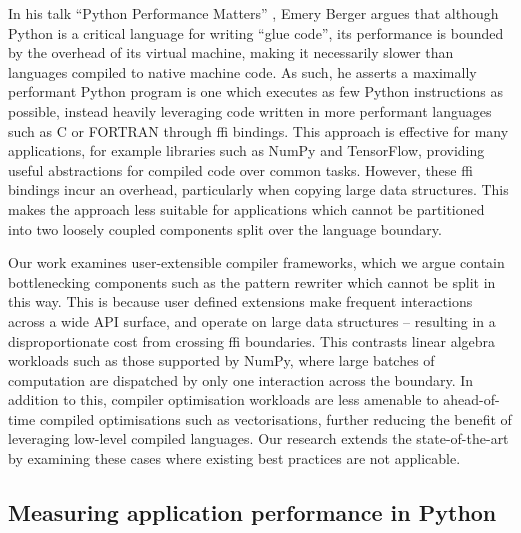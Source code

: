 In his talk ``Python Performance Matters'' \cite{emerybergerPythonPerformanceMatters2022}, Emery Berger argues that although Python is a critical language for writing ``glue code'', its performance is bounded by the overhead of its virtual machine, making it necessarily slower than languages compiled to native machine code.
As such, he asserts a maximally performant Python program is one which executes as few Python instructions as possible, instead heavily leveraging code written in more performant languages such as C or FORTRAN through \ac{ffi} bindings.
This approach is effective for many applications, for example libraries such as NumPy and TensorFlow, providing useful abstractions for compiled code over common tasks.
However, these \ac{ffi} bindings incur an overhead, particularly when copying large data structures.
This makes the approach less suitable for applications which cannot be partitioned into two loosely coupled components split over the language boundary.

Our work examines user-extensible compiler frameworks, which we argue contain bottlenecking components such as the pattern rewriter which cannot be split in this way.
This is because user defined extensions make frequent interactions across a wide API surface, and operate on large data structures -- resulting in a disproportionate cost from crossing \ac{ffi} boundaries. This contrasts linear algebra workloads such as those supported by NumPy, where large batches of computation are dispatched by only one interaction across the boundary.
In addition to this, compiler optimisation workloads are less amenable to ahead-of-time compiled optimisations such as vectorisations, further reducing the benefit of leveraging low-level compiled languages.
Our research extends the state-of-the-art by examining these cases where existing best practices are not applicable.


\subsection{Measuring application performance in Python}
\label{sec:python-performance-application}

